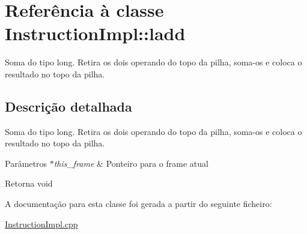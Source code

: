 \hypertarget{class_instruction_impl_1_1ladd}{}\section{Referência à classe Instruction\+Impl\+:\+:ladd}
\label{class_instruction_impl_1_1ladd}


Soma do tipo long. Retira os dois operando do topo da pilha, soma-\/os e coloca o resultado no topo da pilha.  




\subsection{Descrição detalhada}
Soma do tipo long. Retira os dois operando do topo da pilha, soma-\/os e coloca o resultado no topo da pilha. 


\begin{DoxyParams}{Parâmetros}
{\em $\ast$this\+\_\+frame} & Ponteiro para o frame atual \\
\hline
\end{DoxyParams}
\begin{DoxyReturn}{Retorna}
void 
\end{DoxyReturn}


A documentação para esta classe foi gerada a partir do seguinte ficheiro\+:\begin{DoxyCompactItemize}
\item 
\hyperlink{_instruction_impl_8cpp}{Instruction\+Impl.\+cpp}\end{DoxyCompactItemize}

